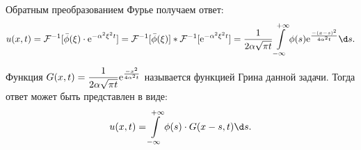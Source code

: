 Обратным преобразованием Фурье получаем ответ:
\[
    u(x, t) = \mathcal{F}^{-1}[\bar{\phi}(\xi)\cdot\e^{-\alpha^2\xi^2 t}] =
    \mathcal{F}^{-1}[\bar{\phi}(\xi)]*\mathcal{F}^{-1}[\e^{-\alpha^2\xi^2 t}]=
    \frac{1}{2\alpha\sqrt{\pi t}} \int\limits_{-\infty}^{+\infty} \phi(s)
    \e^{\frac{-(x-s)^2}{4\alpha^2 t}}\d s.
\]

Функция \( \displaystyle G(x, t) = \frac{1}{2\alpha\sqrt{\pi t}}
\mathrm{e}^{\frac{-x^2}{4\alpha^2 t}} \) называется функцией Грина данной задачи. Тогда
ответ может быть представлен в виде:
\[
    u(x, t) = \int\limits_{-\infty}^{+\infty} \phi(s)\cdot G(x-s, t)\d s.
\]

\newpage
